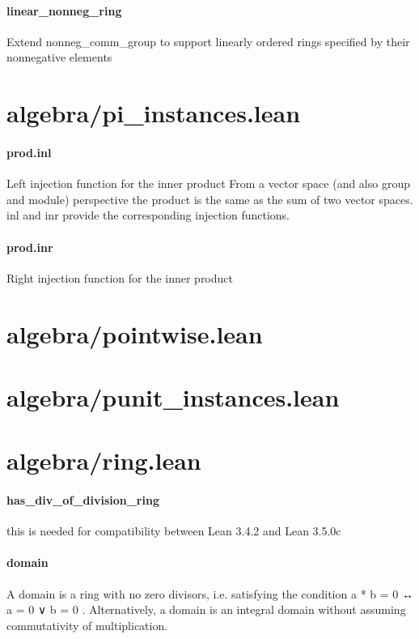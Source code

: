 \documentclass{article}
\begin{document}
\paragraph{linear\_nonneg\_ring}
\par
Extend 
\colorbox[RGB]{253,246,227}{{{{\color[RGB]{101, 123, 131} nonneg\_comm\_group }}}} to support linearly ordered rings
specified by their nonnegative elements
\section{algebra/pi\_instances.lean}\paragraph{prod.inl}
\par
Left injection function for the inner product
From a vector space (and also group and module) perspective the product is the same as the sum of
two vector spaces. 
\colorbox[RGB]{253,246,227}{{{{\color[RGB]{101, 123, 131} inl }}}} and 
\colorbox[RGB]{253,246,227}{{{{\color[RGB]{101, 123, 131} inr }}}} provide the corresponding injection functions.
\paragraph{prod.inr}
\par
Right injection function for the inner product
\section{algebra/pointwise.lean}\section{algebra/punit\_instances.lean}\section{algebra/ring.lean}\paragraph{has\_div\_of\_division\_ring}
\par
this is needed for compatibility between Lean 3.4.2 and Lean 3.5.0c
\paragraph{domain}
\par
A domain is a ring with no zero divisors, i.e. satisfying
the condition 
\colorbox[RGB]{253,246,227}{{{{\color[RGB]{101, 123, 131} a  }}}{{{\color[RGB]{181, 137, 0} * }}}{{{\color[RGB]{101, 123, 131}  b  }}}{{{\color[RGB]{181, 137, 0} = }}}{{{\color[RGB]{101, 123, 131}   }}}{{{\color[RGB]{108, 113, 196} 0 }}}{{{\color[RGB]{101, 123, 131}   }}}{{{\color[RGB]{181, 137, 0} ↔ }}}{{{\color[RGB]{101, 123, 131}  a  }}}{{{\color[RGB]{181, 137, 0} = }}}{{{\color[RGB]{101, 123, 131}   }}}{{{\color[RGB]{108, 113, 196} 0 }}}{{{\color[RGB]{101, 123, 131}   }}}{{{\color[RGB]{181, 137, 0} ∨ }}}{{{\color[RGB]{101, 123, 131}  b  }}}{{{\color[RGB]{181, 137, 0} = }}}{{{\color[RGB]{101, 123, 131}   }}}{{{\color[RGB]{108, 113, 196} 0 }}}}. Alternatively, a domain
is an integral domain without assuming commutativity of multiplication.
\end{document}

